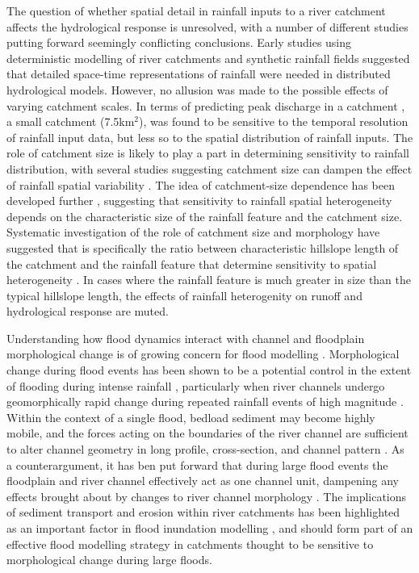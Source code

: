 The question of whether spatial detail in rainfall inputs to a river catchment affects the hydrological response is unresolved, with a number of different studies putting forward seemingly conflicting conclusions. Early studies using deterministic modelling of river catchments and synthetic rainfall fields \citep{wilson1979influence} suggested that detailed space-time representations of rainfall were needed in distributed hydrological models. However, no allusion was made to the possible effects of varying catchment scales. In terms of predicting peak discharge in a catchment \citep{krajewski1991monte}, a small catchment (7.5km\(^2\)), was found to be sensitive to the temporal resolution of rainfall input data, but less so to the spatial distribution of rainfall inputs.  
The role of catchment size is likely to play a part in determining sensitivity to rainfall distribution, with several studies suggesting catchment size can dampen the effect of rainfall spatial variability \citep{segond2007simulation,nicotina2008impact}. The idea of catchment-size dependence has been developed further \citep{gabellani2007propagation}, suggesting that sensitivity to rainfall spatial heterogeneity depends on the characteristic size of the rainfall feature and the catchment size. Systematic investigation of the role of catchment size and morphology have suggested that is specifically the ratio between characteristic hillslope length of the catchment and the rainfall feature that determine sensitivity to spatial heterogeneity \citep{nicotina2008impact}. In cases where the rainfall feature is much greater in size than the typical hillslope length, the effects of rainfall heterogenity on runoff and hydrological response are muted. 

Understanding how flood dynamics interact with channel and floodplain morphological change is of growing concern for flood modelling \citep{fewtrell2011geometric}. Morphological change during flood events has been shown to be a potential control in the extent of flooding during intense rainfall \citep{wong2015sensitivity}, particularly when river channels undergo geomorphically rapid change during repeated rainfall events of high magnitude \citep{slater2016extent}. Within the context of a single flood, bedload sediment may become highly mobile, and the forces acting on the boundaries of the river channel are sufficient to alter channel geometry in long profile, cross-section, and channel pattern \citep{wong2015sensitivity,kleinhans2013splitting}. As a counterargument, it has ben put forward that during large flood events the floodplain and river channel effectively act as one channel unit, dampening any effects brought about by changes to river channel morphology \citep{bates2005numerical}. The implications of sediment transport and erosion within river catchments has been highlighted as an important factor in flood inundation modelling \citep{lane2007interactions,lane2008reconceptualising,neuhold2009incorporating}, and should form part of an effective flood modelling strategy \citep{wong2015sensitivity} in catchments thought to be sensitive to morphological change during large floods.

